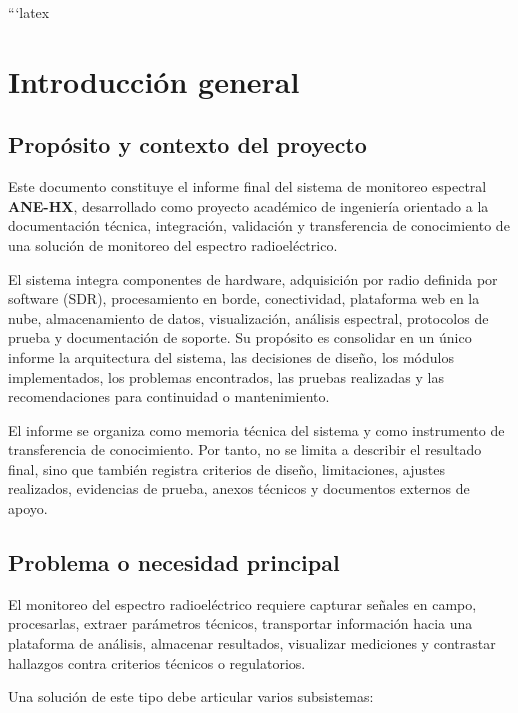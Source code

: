 ```latex
\chapter{Introducción general}
\label{chap:introduction}

\section{Propósito y contexto del proyecto}

Este documento constituye el informe final del sistema de monitoreo espectral \textbf{ANE-HX}, desarrollado como proyecto académico de ingeniería orientado a la documentación técnica, integración, validación y transferencia de conocimiento de una solución de monitoreo del espectro radioeléctrico.

El sistema integra componentes de hardware, adquisición por radio definida por software (SDR), procesamiento en borde, conectividad, plataforma web en la nube, almacenamiento de datos, visualización, análisis espectral, protocolos de prueba y documentación de soporte. Su propósito es consolidar en un único informe la arquitectura del sistema, las decisiones de diseño, los módulos implementados, los problemas encontrados, las pruebas realizadas y las recomendaciones para continuidad o mantenimiento.

El informe se organiza como memoria técnica del sistema y como instrumento de transferencia de conocimiento. Por tanto, no se limita a describir el resultado final, sino que también registra criterios de diseño, limitaciones, ajustes realizados, evidencias de prueba, anexos técnicos y documentos externos de apoyo.

\section{Problema o necesidad principal}

El monitoreo del espectro radioeléctrico requiere capturar señales en campo, procesarlas, extraer parámetros técnicos, transportar información hacia una plataforma de análisis, almacenar resultados, visualizar mediciones y contrastar hallazgos contra criterios técnicos o regulatorios.

Una solución de este tipo debe articular varios subsistemas:

